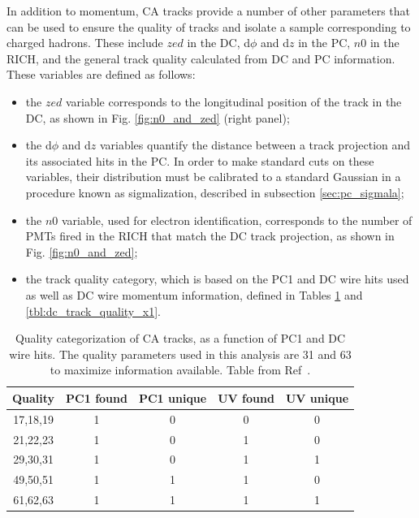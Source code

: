 In addition to momentum, CA tracks provide a number of other parameters that can be used to ensure the quality of tracks and isolate a sample corresponding to charged hadrons. These include $zed$ in the DC, d$\phi$ and d$z$ in the PC, $n0$ in the RICH, and the general track quality calculated from DC and PC information. These variables are defined as follows:
\begin{itemize}
\item the $zed$ variable corresponds to the longitudinal position of the track in the DC, as shown in Fig. \ref{fig:n0_and_zed} (right panel);
\item the d$\phi$ and d$z$ variables quantify the distance between a track projection and its associated hits in the PC. In order to make standard cuts on these variables, their distribution must be calibrated to a standard Gaussian in a procedure known as sigmalization, described in subsection \ref{sec:pc_sigmala};
\item the $n0$ variable, used for electron identification, corresponds to the number of PMTs fired in the RICH that match the DC track projection, as shown in Fig. \ref{fig:n0_and_zed};
\item the track quality category, which is based on the PC1 and DC wire hits used as well as DC wire momentum information, defined in Tables \ref{tbl:dc_track_quality_pc1} and \ref{tbl:dc_track_quality_x1}.
\end{itemize}

\begin{table}[!ht]
\caption{Quality categorization of CA tracks, as a function of PC1 and DC wire hits. The quality parameters used in this analysis are 31 and 63 to maximize information available. Table from Ref~\cite{Belmont:2012pka}.}
\begin{center}
    \begin{tabular}{ccccc}
    \hline
    Quality & PC1 found  & PC1 unique & UV found & UV unique\\ \hline
    17,18,19 & 1 & 0 & 0 & 0\\ \hline
    21,22,23 & 1 & 0 & 1 & 0\\ \hline
    29,30,31 & 1 & 0 & 1 & 1\\ \hline
    49,50,51 & 1 & 1 & 1 & 0\\ \hline
    61,62,63 & 1 & 1 & 1 & 1\\ \hline
    \end{tabular}
\end{center}
\label{tbl:dc_track_quality_pc1}
\end{table}

